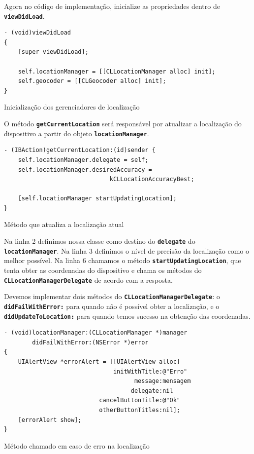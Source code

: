 \documentclass[a4paper,12pt,brazil,doubleside]{book}
\begin{document}
\begin{singlespace}
Agora no código de implementação, inicialize as propriedades dentro de \texttt{\textbf{viewDidLoad}}.

\begin{listing}[H]
\begin{verbatim}
- (void)viewDidLoad
{
    [super viewDidLoad];
    
    self.locationManager = [[CLLocationManager alloc] init];
    self.geocoder = [[CLGeocoder alloc] init];
}
\end{verbatim}
\caption{Inicialização dos gerenciadores de localização}
\end{listing}


O método \texttt{\textbf{getCurrentLocation}} será responsável por atualizar a localização do dispositivo a partir do objeto \texttt{\textbf{locationManager}}.

\begin{listing}[H]
\begin{verbatim}
- (IBAction)getCurrentLocation:(id)sender {
    self.locationManager.delegate = self;
    self.locationManager.desiredAccuracy =
                              kCLLocationAccuracyBest;
    
    [self.locationManager startUpdatingLocation];
}
\end{verbatim}
\caption{Método que atualiza a localização atual}
\end{listing}


Na linha 2 definimos nossa classe como destino do \texttt{\textbf{delegate}} do \texttt{\textbf{locationManager}}. Na linha 3 definimos o nível de precisão da localização como o melhor possível. Na linha 6 chamamos o método \texttt{\textbf{startUpdatingLocation}}, que tenta obter as coordenadas do dispositivo e chama os métodos do \texttt{\textbf{CLLocationManagerDelegate}} de acordo com a resposta.

Devemos implementar dois métodos do \texttt{\textbf{CLLocationManagerDelegate}}: o\\ \texttt{\textbf{didFailWithError:}} para quando não é possível obter a localização, e o\\ \texttt{\textbf{didUpdateToLocation:}} para quando temos sucesso na obtenção das coordenadas.

\begin{listing}[H]
\begin{verbatim}
- (void)locationManager:(CLLocationManager *)manager
        didFailWithError:(NSError *)error
{
    UIAlertView *errorAlert = [[UIAlertView alloc]
                               initWithTitle:@"Erro"
                                     message:mensagem
                                    delegate:nil
                           cancelButtonTitle:@"Ok"
                           otherButtonTitles:nil];
    [errorAlert show];
}
\end{verbatim}
\caption{Método chamado em caso de erro na localização}
\end{listing}



\end{singlespace}
\end{document}

